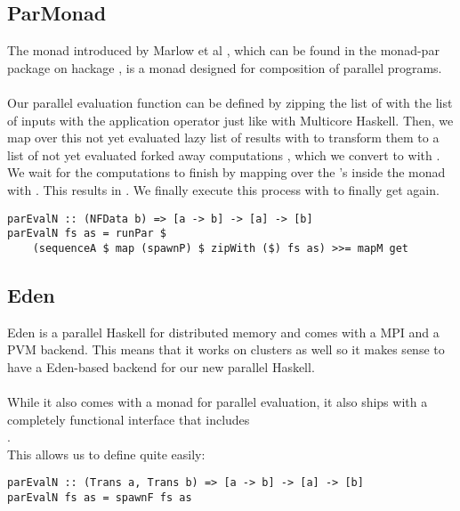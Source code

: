 \subsection{ParMonad}
The  monad introduced by Marlow et al \cite{monad_par_paper}, which can be found in the monad-par package on hackage \cite{monad_par_hackage}, is a monad designed for composition of parallel programs.
\\\\
Our parallel evaluation function  can be defined by zipping the list of \code{[a -> b]} with the list of inputs \code{[a]} with the application operator \code{\$} just like with Multicore Haskell. Then, we map over this not yet evaluated lazy list of results \code{[b]} with  to transform them to a list of not yet evaluated forked away computations , which we convert to  with . We wait for the computations to finish by mapping over the 's inside the  monad with . This results in . We finally execute this process with  to finally get \code{[b]} again.
\begin{lstlisting}[frame=htrbl]
parEvalN :: (NFData b) => [a -> b] -> [a] -> [b]
parEvalN fs as = runPar $ 
	(sequenceA $ map (spawnP) $ zipWith ($) fs as) >>= mapM get
\end{lstlisting}

\subsection{Eden}
Eden \cite{eden_hackage} is a parallel Haskell for distributed memory and comes with a MPI and a PVM backend. This means that it works on clusters as well so it makes sense to have a Eden-based backend for our new parallel Haskell.
\\\\
While it also comes with a monad  for parallel evaluation, it also ships with a completely functional interface that includes
\\
.
\\
This allows us to define  quite easily:
\begin{lstlisting}[frame=htrbl]
parEvalN :: (Trans a, Trans b) => [a -> b] -> [a] -> [b]
parEvalN fs as = spawnF fs as
\end{lstlisting}